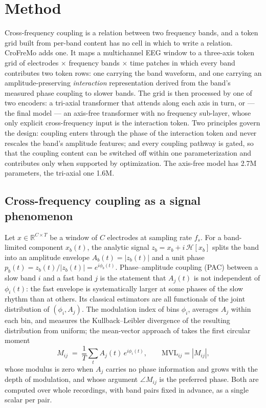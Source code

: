 \section{Method}
\label{sec:method}

Cross-frequency coupling is a relation between two frequency bands, and a
token grid built from per-band content has no cell in which to write a
relation. CroFreMo adds one. It maps a multichannel EEG window to a
three-axis token grid of electrodes $\times$ frequency bands $\times$ time
patches in which every band contributes two token rows: one carrying the
band waveform, and one carrying an amplitude-preserving \emph{interaction}
representation derived from the band's measured phase coupling to slower
bands. The grid is then processed by one of two encoders: a tri-axial transformer that attends along each axis in turn, or --- the final model --- an axis-free transformer with no frequency sub-layer, whose only explicit cross-frequency input is the interaction token.
Two principles govern the design: coupling enters through the phase of the
interaction token and never rescales the band's amplitude features; and
every coupling pathway is gated, so that the coupling content can be
switched off within one parameterization and contributes only when
supported by optimization. The axis-free model has
2.7M parameters, the tri-axial one 1.6M.

\subsection{Cross-frequency coupling as a signal phenomenon}
\label{sec:phenomenon}

Let $x \in \mathbb{R}^{C \times T}$ be a window of $C$ electrodes at
sampling rate $f_s$. For a band-limited component $x_b(t)$, the analytic
signal $z_b = x_b + i\,\mathcal{H}[x_b]$ splits the band into an amplitude
envelope $A_b(t) = |z_b(t)|$ and a unit phase $p_b(t) = z_b(t)/|z_b(t)|
= e^{i\phi_b(t)}$. Phase--amplitude coupling (PAC) between a slow band $i$
and a fast band $j$ is the statement that $A_j(t)$ is not independent of
$\phi_i(t)$: the fast envelope is systematically larger at some phases of
the slow rhythm than at others. Its classical estimators are all functionals
of the joint distribution of $(\phi_i, A_j)$. The modulation index of
\citet{tort2010measuring} bins $\phi_i$, averages $A_j$ within each bin, and
measures the Kullback--Leibler divergence of the resulting distribution
from uniform; the mean-vector approach of \citet{canolty2006high} takes the
first circular moment
\begin{equation}
M_{ij} \;=\; \frac{1}{T}\sum_{t} A_j(t)\,e^{i\phi_i(t)}, \qquad
\mathrm{MVL}_{ij} = |M_{ij}| ,
\label{eq:mvl-classical}
\end{equation}
whose modulus is zero when $A_j$ carries no phase information and grows
with the depth of modulation, and whose argument $\angle M_{ij}$ is the
preferred phase.
Both are computed over whole recordings, with band pairs fixed in advance,
as a single scalar per pair.

